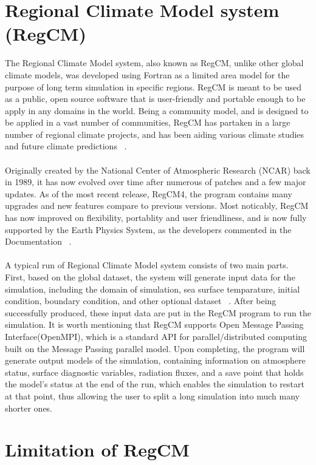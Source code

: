 \section{Regional Climate Model system (RegCM)}

The Regional Climate Model system, also known as RegCM, unlike other global climate models, was developed using Fortran as a limited area model for the purpose of long term simulation in specific regions. RegCM is meant to be used as a public, open source software that is user-friendly and portable enough to be apply in any domains in the world. Being a community model, and is designed to be applied in a vast number of communities, RegCM has partaken in a large number of regional climate projects, and has been aiding various climate studies and future climate predictions ~\cite{regcm_man}. \\
~\\
Originally created by the National Center of Atmospheric Research (NCAR) back in 1989, it has now evolved over time after numerous of patches and a few major updates. As of the most recent release, RegCM4, the program contains many upgrades and new features compare to previous versions. Most noticably, RegCM has now improved on flexibility, portablity and user friendliness, and is now fully supported by the Earth Physics System, as the developers commented in the Documentation ~\cite{regcm_ictp}. \\
~\\
A typical run of Regional Climate Model system consists of two main parts. First, based on the global dataset, the system will generate input data for the simulation, including the domain of simulation, sea surface temparature, initial condition, boundary condition, and other optional dataset ~\cite{regcm_man}. After being successfully produced, these input data are put in the RegCM program to run the simulation. It is worth mentioning that RegCM supports Open Message Passing Interface(OpenMPI), which is a standard API for parallel/distributed computing built on the Message Passing parallel model. Upon completing, the program will generate output models of the simulation, containing information on atmosphere status, surface diagnostic variables, radiation fluxes, and a save point that holds the model's status at the end of the run, which enables the simulation to restart at that point, thus allowing the user to split a long simulation into much many shorter ones. \\

\section{Limitation of RegCM}

